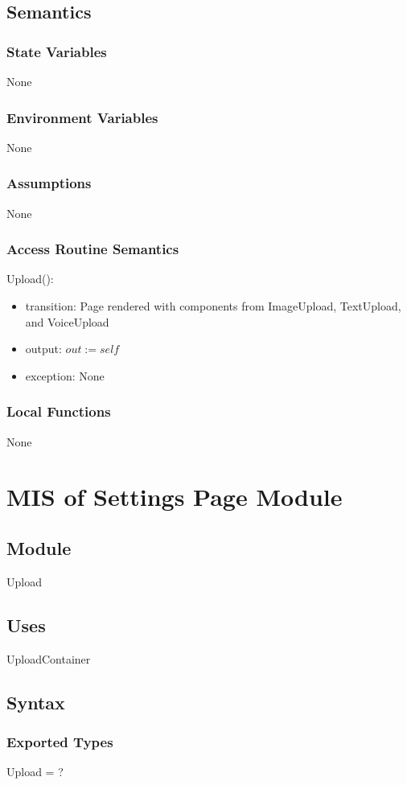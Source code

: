 \documentclass[12pt, titlepage]{article}
\begin{document}
\subsection{Semantics}
\subsubsection{State Variables}
None
\subsubsection{Environment Variables}
None
\subsubsection{Assumptions}
None
\subsubsection{Access Routine Semantics}
\noindent Upload():
\begin{itemize}
	\item transition: Page rendered with components from ImageUpload, 
	TextUpload, and VoiceUpload
	\item output: $out := self$
	\item exception: None
\end{itemize}
\subsubsection{Local Functions}
None

\newpage

\section{MIS of Settings Page Module}
\subsection{Module}
Upload
\subsection{Uses}
UploadContainer
\subsection{Syntax}
\subsubsection{Exported Types}
Upload = ?
\end{document}
